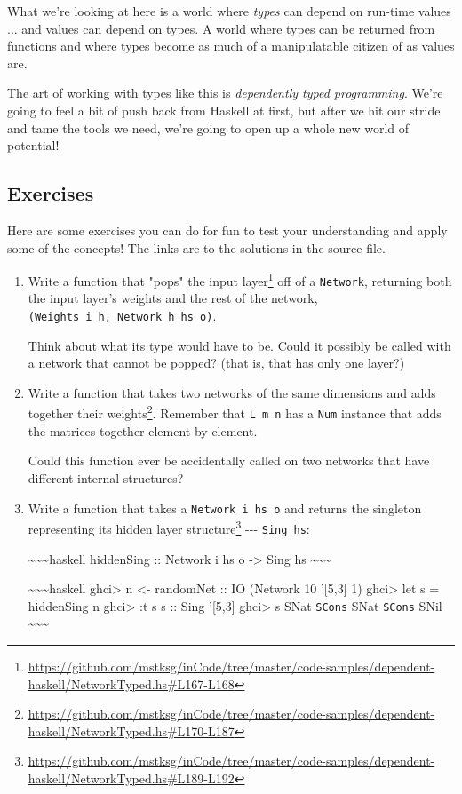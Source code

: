 \documentclass[]{article}
\renewcommand{\href}[2]{#2\footnote{\url{#1}}}
\begin{document}
What we're looking at here is a world where \emph{types} can depend on run-time
values ... and values can depend on types. A world where types can be returned
from functions and where types become as much of a manipulatable citizen of as
values are.

The art of working with types like this is \emph{dependently typed programming}.
We're going to feel a bit of push back from Haskell at first, but after we hit
our stride and tame the tools we need, we're going to open up a whole new world
of potential!

\subsection{Exercises}

Here are some exercises you can do for fun to test your understanding and apply
some of the concepts! The links are to the solutions in the source file.

\begin{enumerate}
\item
  Write a function that
  \href{https://github.com/mstksg/inCode/tree/master/code-samples/dependent-haskell/NetworkTyped.hs\#L167-L168}{"pops"
  the input layer} off of a \texttt{Network}, returning both the input layer's
  weights and the rest of the network,
  \texttt{(Weights\ i\ h,\ Network\ h\ hs\ o)}.

  Think about what its type would have to be. Could it possibly be called with a
  network that cannot be popped? (that is, that has only one layer?)
\item
  Write a
  \href{https://github.com/mstksg/inCode/tree/master/code-samples/dependent-haskell/NetworkTyped.hs\#L170-L187}{function
  that takes two networks of the same dimensions and adds together their
  weights}. Remember that \texttt{L\ m\ n} has a \texttt{Num} instance that adds
  the matrices together element-by-element.

  Could this function ever be accidentally called on two networks that have
  different internal structures?
\item
  Write a function that takes a \texttt{Network\ i\ hs\ o} and
  \href{https://github.com/mstksg/inCode/tree/master/code-samples/dependent-haskell/NetworkTyped.hs\#L189-L192}{returns
  the singleton representing its hidden layer structure} -\/-\/-
  \texttt{Sing\ hs}:

  \textasciitilde{}\textasciitilde{}\textasciitilde{}haskell hiddenSing ::
  Network i hs o -\textgreater{} Sing hs
  \textasciitilde{}\textasciitilde{}\textasciitilde{}

  \textasciitilde{}\textasciitilde{}\textasciitilde{}haskell ghci\textgreater{}
  n \textless{}- randomNet :: IO (Network 10 '{[}5,3{]} 1) ghci\textgreater{}
  let s = hiddenSing n ghci\textgreater{} :t s s :: Sing '{[}5,3{]}
  ghci\textgreater{} s SNat \texttt{SCons} SNat \texttt{SCons} SNil
  \textasciitilde{}\textasciitilde{}\textasciitilde{}
\end{enumerate}
\end{document}
